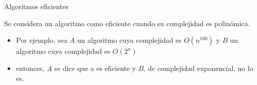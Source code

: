 \documentclass[handout]{beamer}
\begin{document}
\begin{frame}{Algoritmos eficientes}
  \begin{definition}
    Se considera un algoritmo como eficiente cuando su complejidad es
    polin\'omica.
  \end{definition}
  \pause
\begin{itemize}
  \item Por ejemplo, sea $A$ un algoritmo cuya complejidad es $O(n^{100})$ y $B$ un
    algoritmo cuya complejidad es $O(2^n)$
    \pause
  \item entonces, $A$ se dice que a es eficiente y $B$, de complejidad
    exponencial, no lo es.
\end{itemize}
\end{frame}
\end{document}
